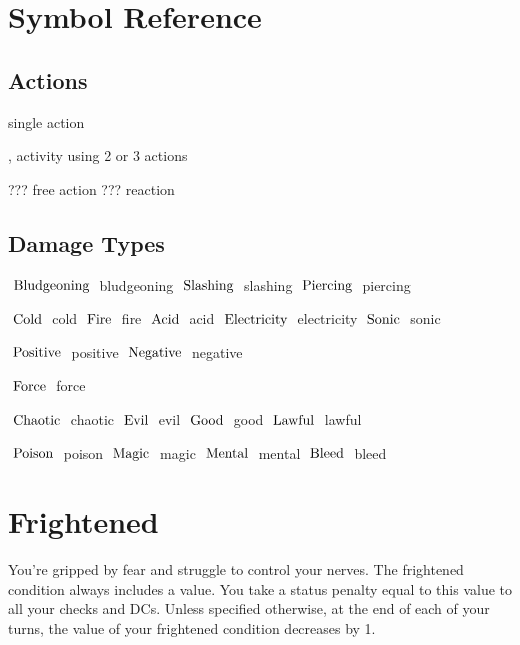 \documentclass[paper=63mm:88mm, DIV=21, fontsize=7.5pt]{scrartcl}
\begin{document}

\newcommand{\Trait}[1]{\Tag{traitBg}{#1}}
\newcommand{\Rare}[0]{\Tag{rareBg}{Rare}}
\newcommand{\Uncommon}[0]{\Tag{uncommonBg}{Uncommon}}

\newcommand{\Traits}[1]{\colorbox{tagsBg}{#1}}

\section{Symbol Reference}

\subsection{Actions\hfill{}}

 single action 

,  activity using 2 or 3 actions

??? free action 
??? reaction

\subsection{Damage Types\hfill{}}

\(\DamageType{Bludgeoning}\) bludgeoning
\(\DamageType{Slashing}\) slashing
\(\DamageType{Piercing}\) piercing

\(\DamageType{Cold}\) cold
\(\DamageType{Fire}\) fire
\(\DamageType{Acid}\) acid
\(\DamageType{Electricity}\) electricity
\(\DamageType{Sonic}\) sonic

\(\DamageType{Positive}\) positive
\(\DamageType{Negative}\) negative

\(\DamageType{Force}\) force

\(\DamageType{Chaotic}\) chaotic
\(\DamageType{Evil}\) evil
\(\DamageType{Good}\) good
\(\DamageType{Lawful}\) lawful

\(\DamageType{Poison}\) poison
\(\DamageType{Magic}\) magic
\(\DamageType{Mental}\) mental
\(\DamageType{Bleed}\) bleed

\section{Frightened}

You're gripped by fear and struggle to control your nerves.
The frightened condition always includes a value.
You take a status penalty equal to this value to all your checks and DCs.
Unless specified otherwise, at the end of each of your turns, the value of your frightened condition decreases by 1.
\end{document}
